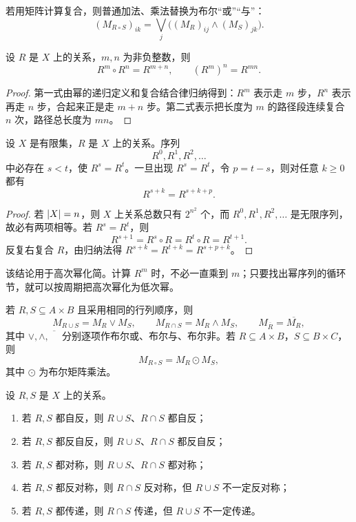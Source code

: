 若用矩阵计算复合，则普通加法、乘法替换为布尔“或”“与”：
\[
  (M_{R\circ S})_{ik}=\bigvee_j\bigl((M_R)_{ij}\wedge(M_S)_{jk}\bigr).
\]

\begin{theorem}[关系幂的运算律]\label{ch2-power-laws}
设 $R$ 是 $X$ 上的关系，$m,n$ 为非负整数，则
\[
  R^m\circ R^n=R^{m+n},\qquad
  (R^m)^n=R^{mn}.
\]
\end{theorem}

\begin{proof}
第一式由幂的递归定义和复合结合律归纳得到：$R^m$ 表示走 $m$ 步，$R^n$ 表示再走 $n$ 步，合起来正是走 $m+n$ 步。第二式表示把长度为 $m$ 的路径段连续复合 $n$ 次，路径总长度为 $mn$。
\end{proof}

\begin{theorem}[有限集上关系幂的周期性]\label{ch2-power-periodic}
设 $X$ 是有限集，$R$ 是 $X$ 上的关系。序列
\[
R^0,R^1,R^2,\ldots
\]
中必存在 $s<t$，使 $R^s=R^t$。一旦出现 $R^s=R^t$，令 $p=t-s$，则对任意 $k\ge0$ 都有
\[
  R^{s+k}=R^{s+k+p}.
\]
\end{theorem}

\begin{proof}
若 $\lvert X\rvert=n$，则 $X$ 上关系总数只有 $2^{n^2}$ 个，而 $R^0,R^1,R^2,\ldots$ 是无限序列，故必有两项相等。若 $R^s=R^t$，则
\[
R^{s+1}=R^s\circ R=R^t\circ R=R^{t+1}.
\]
反复右复合 $R$，由归纳法得 $R^{s+k}=R^{t+k}=R^{s+p+k}$。
\end{proof}

该结论用于高次幂化简。计算 $R^m$ 时，不必一直乘到 $m$；只要找出幂序列的循环节，就可以按周期把高次幂化为低次幂。

\begin{method}[关系运算的矩阵公式]\label{ch2-relation-matrix-ops}
若 $R,S\subseteq A\times B$ 且采用相同的行列顺序，则
\[
M_{R\cup S}=M_R\vee M_S,\qquad
M_{R\cap S}=M_R\wedge M_S,\qquad
M_{\overline R}=\overline{M_R},
\]
其中 $\vee,\wedge,\overline{\phantom M}$ 分别逐项作布尔或、布尔与、布尔非。若 $R\subseteq A\times B$，$S\subseteq B\times C$，则
\[
M_{R\circ S}=M_R\odot M_S,
\]
其中 $\odot$ 为布尔矩阵乘法。
\end{method}

\begin{theorem}[关系性质在运算下的保持性]\label{ch2-property-preservation}
设 $R,S$ 是 $X$ 上的关系。
\begin{enumerate}
  \item 若 $R,S$ 都自反，则 $R\cup S$、$R\cap S$ 都自反；
  \item 若 $R,S$ 都反自反，则 $R\cup S$、$R\cap S$ 都反自反；
  \item 若 $R,S$ 都对称，则 $R\cup S$、$R\cap S$ 都对称；
  \item 若 $R,S$ 都反对称，则 $R\cap S$ 反对称，但 $R\cup S$ 不一定反对称；
  \item 若 $R,S$ 都传递，则 $R\cap S$ 传递，但 $R\cup S$ 不一定传递。
\end{enumerate}
\end{theorem}

